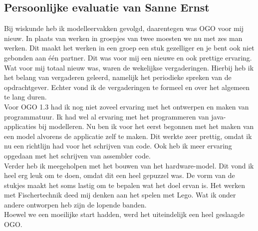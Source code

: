 \subsection{Persoonlijke evaluatie van Sanne Ernst}

Bij wiskunde heb ik modelleervakken gevolgd, daarentegen was OGO
voor mij nieuw. In plaats van werken in groepjes van twee moesten we
nu met zes man werken. Dit maakt het werken in een groep een stuk
gezelliger en je bent ook niet gebonden aan \'e\'en partner.
Dit was voor mij een nieuwe en ook prettige ervaring. \\

Wat voor mij totaal nieuw was, waren de wekelijkse vergaderingen.
Hierbij heb ik het belang van vergaderen geleerd, namelijk het
periodieke spreken van de opdrachtgever. Echter vond ik de
vergaderingen te formeel en over het algemeen te lang duren.\\

Voor OGO 1.3 had ik nog niet zoveel ervaring met het ontwerpen en
maken van programmatuur. Ik had wel al ervaring met het programmeren
van java-applicaties bij modelleren. Nu ben ik voor het eerst
begonnen met het maken van een model alvorens de applicatie zelf te
maken. Dit werkte zeer prettig, omdat ik nu een richtlijn had voor
het schrijven van code. Ook heb ik meer ervaring opgedaan met het
schrijven van assembler code.\\

Verder heb ik meegeholpen met het bouwen van het hardware-model. Dit
vond ik heel erg leuk om te doen, omdat dit een heel gepuzzel was.
De vorm van de stukjes maakt het soms lastig om te bepalen wat het
doel ervan is. Het werken met Fischertechnik deed mij denken aan
het spelen met Lego. Wat ik onder andere ontworpen heb zijn de lopende banden.\\

Hoewel we een moeilijke start hadden, werd het uiteindelijk een heel
geslaagde OGO.
